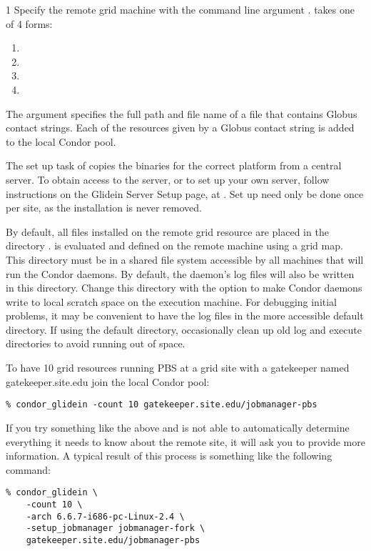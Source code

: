 \begin{ManPage}{\label{man-condor-glidein}}{1}
Specify the remote grid machine with the command line
argument .
 takes one of 4 forms:
\begin{enumerate}
  \item {} 
  \item {} 
  \item {} 
  \item {} 
\end{enumerate}
The argument  specifies the full
path and file name of a file that contains Globus contact strings.
Each of the resources given by a Globus contact string 
is added to the local Condor pool.

The set up task of 
copies the binaries for the correct platform from a central server.
To obtain access to the server,
or to set up your own server, follow
instructions on the Glidein Server Setup page,
at .
Set up need only be done once per site, as the installation
is never removed.

By default, all files installed on the remote grid resource are placed in
the directory
.
 is evaluated and defined 
on the remote machine using a grid map.
This directory must be in a shared file system accessible
by all machines that will run the Condor daemons.
By default, the daemon's log files will also be written in this 
directory.
Change this directory with the  option to make
Condor daemons write to local scratch space on the execution machine.
For debugging initial problems, it may be convenient to have the log
files in the more accessible default directory.
If using the default directory, 
occasionally clean up old log and execute directories
to avoid running out of space.

\Examples

To have
10 grid resources running PBS at a grid site with a
gatekeeper named gatekeeper.site.edu join the local Condor pool:
\begin{verbatim}
% condor_glidein -count 10 gatekeeper.site.edu/jobmanager-pbs
\end{verbatim}

If you try something like the above and  is not able to
automatically determine everything it needs to know about the remote site,
it will ask you to provide more information.  A typical result of this
process is something like the following command:
\begin{verbatim}
% condor_glidein \
    -count 10 \
    -arch 6.6.7-i686-pc-Linux-2.4 \
    -setup_jobmanager jobmanager-fork \
    gatekeeper.site.edu/jobmanager-pbs
\end{verbatim}


\end{ManPage}
